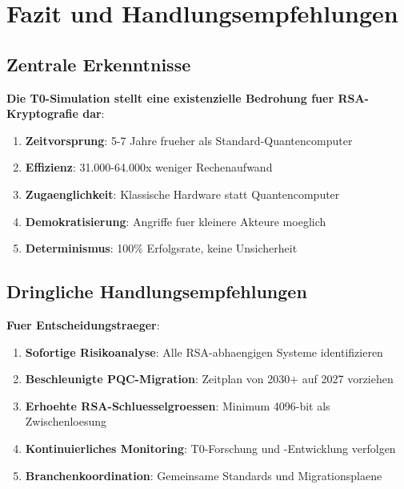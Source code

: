 \documentclass[12pt,a4paper]{article}
\begin{document}
	\section{Fazit und Handlungsempfehlungen}
	
	\subsection{Zentrale Erkenntnisse}
	
	\begin{tcolorbox}[colback=red!5!white,colframe=red!75!black,title=Kritische Schlussfolgerungen]
		\textbf{Die T0-Simulation stellt eine existenzielle Bedrohung fuer RSA-Kryptografie dar}:
		
		\begin{enumerate}
			\item \textbf{Zeitvorsprung}: 5-7 Jahre frueher als Standard-Quantencomputer
			\item \textbf{Effizienz}: 31.000-64.000x weniger Rechenaufwand
			\item \textbf{Zugaenglichkeit}: Klassische Hardware statt Quantencomputer
			\item \textbf{Demokratisierung}: Angriffe fuer kleinere Akteure moeglich
			\item \textbf{Determinismus}: 100\% Erfolgsrate, keine Unsicherheit
		\end{enumerate}
	\end{tcolorbox}
	
	\subsection{Dringliche Handlungsempfehlungen}
	
	\textbf{Fuer Entscheidungstraeger}:
	
	\begin{enumerate}
		\item \textbf{Sofortige Risikoanalyse}: Alle RSA-abhaengigen Systeme identifizieren
		\item \textbf{Beschleunigte PQC-Migration}: Zeitplan von 2030+ auf 2027 vorziehen
		\item \textbf{Erhoehte RSA-Schluesselgroessen}: Minimum 4096-bit als Zwischenloesung
		\item \textbf{Kontinuierliches Monitoring}: T0-Forschung und -Entwicklung verfolgen
		\item \textbf{Branchenkoordination}: Gemeinsame Standards und Migrationsplaene
	\end{enumerate}
	
\end{document}
